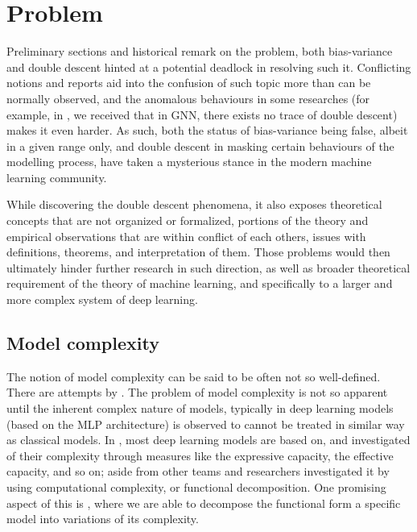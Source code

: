 \documentclass[10pt,oneside,oldfontcommands,dvipsnames,article]{memoir}
\begin{document}
\clearpage

\section{Problem}

Preliminary sections and historical remark on the problem, both bias-variance and double descent hinted at a potential deadlock in resolving such it. Conflicting notions and reports aid into the confusion of such topic more than can be normally observed, and the anomalous behaviours in some researches (for example, in \cite{shi2024homophilymodulatesdoubledescent}, we received that in GNN, there exists no trace of double descent) makes it even harder. As such, both the status of bias-variance being false, albeit in a given range only, and double descent in masking certain behaviours of the modelling process, have taken a mysterious stance in the modern machine learning community. 

While discovering the double descent phenomena, it also exposes theoretical concepts that are not organized or formalized, portions of the theory and empirical observations that are within conflict of each others, issues with definitions, theorems, and interpretation of them. Those problems would then ultimately hinder further research in such direction, as well as broader theoretical requirement of the theory of machine learning, and specifically to a larger and more complex system of deep learning. 
\subsection{Model complexity}
The notion of model complexity can be said to be often not so well-defined. There are attempts by \cite{hu2021modelcomplexitydeeplearning,luo2024investigatingimpactmodelcomplexity,barceló2020modelinterpretabilitylenscomputational,Molnar_2020,janik2021complexitydeepneuralnetworks}. The problem of model complexity is not so apparent until the inherent complex nature of models, typically in deep learning models (based on the MLP architecture) is observed to cannot be treated in similar way as classical models. In \cite{hu2021modelcomplexitydeeplearning}, most deep learning models are based on, and investigated of their complexity through measures like the expressive capacity, the effective capacity, and so on; aside from other teams and researchers investigated it by using computational complexity, or functional decomposition. One promising aspect of this is \cite{Molnar_2020}, where we are able to decompose the functional form a specific model into variations of its complexity. 
\end{document}
